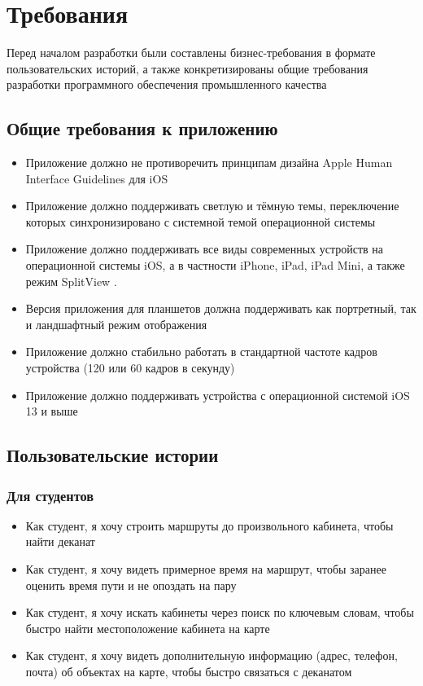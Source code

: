\chapter{Требования}
  Перед началом разработки были составлены бизнес-требования в формате пользовательских историй, а также конкретизированы общие требования разработки программного обеспечения промышленного качества

  \section{Общие требования к приложению}
    \begin{itemize}
      \item Приложение должно не противоречить принципам дизайна Apple Human Interface Guidelines для iOS \cite{HumanInterfaceGuidelines}
      \item Приложение должно поддерживать светлую и тёмную темы, переключение которых синхронизировано с системной темой операционной системы
      \item Приложение должно поддерживать все виды современных устройств на операционной системы iOS, а в частности iPhone, iPad, iPad Mini, а также режим SplitView \cite{SplitView}.
      \item Версия приложения для планшетов должна поддерживать как портретный, так и ландшафтный режим отображения
      \item Приложение должно стабильно работать в стандартной частоте кадров устройства (120 или 60 кадров в секунду)
      \item Приложение должно поддерживать устройства с операционной системой iOS 13 и выше
    \end{itemize}

  \section{Пользовательские истории}
    \subsection{Для студентов}
      \begin{itemize}
        \item Как студент, я хочу строить маршруты до произвольного кабинета, чтобы найти деканат
        \item Как студент, я хочу видеть примерное время на маршрут, чтобы заранее оценить время пути и не опоздать на пару
        \item Как студент, я хочу искать кабинеты через поиск по ключевым словам, чтобы быстро найти местоположение кабинета на карте
        \item Как студент, я хочу видеть дополнительную информацию (адрес, телефон, почта) об объектах на карте, чтобы быстро связаться с деканатом
      \end{itemize}
